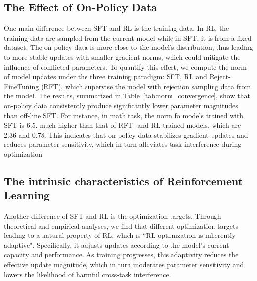 \documentclass{article} %
\begin{document}
\subsection{The Effect of On-Policy Data}
\label{chapter:on-policy}
One main difference between SFT and RL is the training data. In RL, the training data are sampled from the current model while in SFT, it is from a fixed dataset. The on-policy data is more close to the model’s distribution, thus leading to more stable updates with smaller gradient norms, which could mitigate the influence of conflicted parameters.
To quantify this effect, we compute the norm of model updates under the three training paradigm: SFT, RL and Reject-FineTuning (RFT), which supervise the model with rejection sampling data from the model. The results, summarized in Table~\ref{tab:norm_convergence}, show that on-policy data consistently produce significantly lower parameter magnitudes than off-line SFT. For instance, in math task,  the norm fo models trained with SFT is 6.5, much higher than that of RFT- and RL-trained models, which are 2.36 and 0.78. This indicates that on-policy data stabilizes gradient updates and reduces parameter sensitivity, which in turn alleviates task interference during optimization.



\subsection{The intrinsic characteristics of Reinforcement Learning}
Another difference of SFT and RL is the optimization targets. Through theoretical and empirical analyses, we find that different optimization targets leading to a natural property of RL, which is ``RL optimization is inherently adaptive". Specifically, it  adjusts updates according to the model’s current capacity and performance. As training progresses, this adaptivity reduces the effective update magnitude, which in turn moderates parameter sensitivity and lowers the likelihood of harmful cross-task interference.


\end{document}
